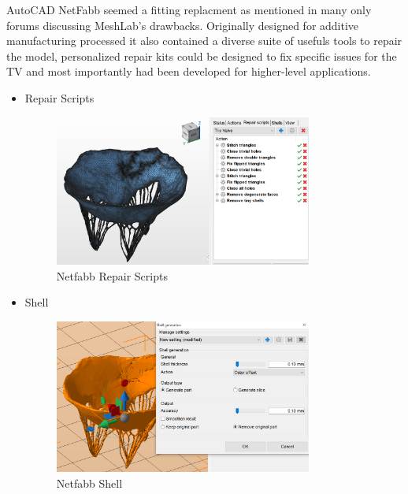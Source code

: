 
AutoCAD NetFabb seemed a fitting replacment as mentioned in many only forums discussing MeshLab's drawbacks. Originally designed for additive manufacturing processed it also contained a diverse suite of usefuls tools to repair the model, personalized repair kits could be designed to fix specific issues for the \gls{TV} and most importantly had been developed for higher-level applications.
\begin{itemize}
    \item Repair Scripts
          \begin{figure}
              \centering
              \includegraphics[width=0.8\textwidth]{figures/NetFabbRepair.png}
              \caption{Netfabb Repair Scripts}
              \label{fig:NetfabbRepair}
          \end{figure}
    \item Shell
          \begin{figure}
              \centering
              \includegraphics[width=0.8\textwidth]{figures/NetFabbShell.png}
              \caption{Netfabb Shell}
              \label{fig:NetfabbShell}
          \end{figure}
\end{itemize}


